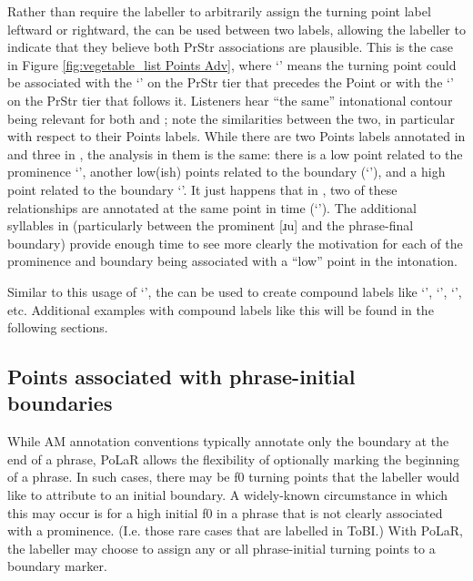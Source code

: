 Rather than require the labeller to arbitrarily assign the turning point label leftward or rightward, the \textlabel{/} can be used between two labels, allowing the labeller to indicate that they believe both PrStr associations are plausible. This is the case in Figure \ref{fig:vegetable_list Points Adv}, where ‘\textlabel{*</]>}’ means the turning point could be associated with the ‘\textlabel{*}’ on the PrStr tier that precedes the Point or with the ‘\textlabel{]}’ on the PrStr tier that follows it. Listeners hear “the same” intonational contour being relevant for both  and ; note the similarities between the two, in particular with respect to their Points labels. While there are two Points labels annotated in  and three in , the analysis in them is the same: there is a low point related to the prominence ‘\textlabel{(*<)}’, another low(ish) points related to the boundary (‘\textlabel{]>}’), and a high point related to the boundary ‘\textlabel{(]>)}’. It just happens that in , two of these relationships are annotated at the same point in time (‘\textlabel{*</]>}’). The additional syllables in  (particularly between the prominent [ɹu] and the phrase-final boundary) provide enough time to see more clearly the motivation for each of the prominence and boundary being associated with a “low” point in the intonation.

Similar to this usage of ‘\textlabel{*</]>}’, the \textlabel{/} can be used to create compound labels like ‘\textlabel{*</*>}’, ‘\textlabel{*>/]>}’, ‘\textlabel{]</*>}’, etc. Additional examples with compound labels like this will be found in the following sections.

\subsection{Points associated with phrase-initial boundaries}\label{sec:points-associated-with-phrase-initial-boundaries}
While AM annotation conventions typically annotate only the boundary at the end of a phrase, PoLaR allows the flexibility of optionally marking the beginning of a phrase. In such cases, there may be f0 turning points that the labeller would like to attribute to an initial boundary. A widely-known circumstance in which this may occur is for a high initial f0 in a phrase that is not clearly associated with a prominence. (I.e. those rare cases that are labelled  in ToBI.) With PoLaR, the labeller may choose to assign any or all phrase-initial turning points to a \textlabel{[} boundary marker.

